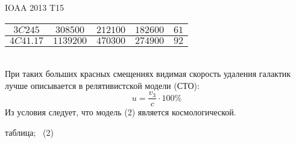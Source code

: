 \begin{problem}{IOAA 2013 T15}
\begin{solution}
\begin{table}[h]
\begin{tabular}{|c|c|c|c|c|}
        $3C245$ & $308500$ & $212100$ & $182600$ & $61$ \\ \hline
        $4C41.17$ & $1139200$ & $470300$ & $274900$ & $92$ \\ \hline
    \end{tabular}
    \end{table}\\
    При таких больших красных смещениях видимая скорость удаления галактик лучше описывается в релятивистской модели (СТО):
    \begin{equation}
        u=\frac{v_3}{c}\cdot 100\%
    \end{equation}
    Из условия следует, что модель (2) является космологической.

\end{solution}

\begin{answer}
	таблица; \
    (2)
\end{answer}
\end{problem}